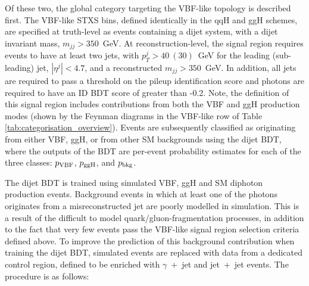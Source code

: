 Of these two, the global category targeting the VBF-like topology is described first. The VBF-like STXS bins, defined identically in the qqH and ggH schemes, are specified at truth-level as events containing a dijet system, with a dijet invariant mass, $m_{jj}>350$~GeV. At reconstruction-level, the signal region requires events to have at least two jets, with $p_T^{j}>40~(30)$~GeV for the leading (sub-leading) jet, $|\eta^j|<4.7$, and a reconstructed $m_{jj}>350$~GeV. In addition, all jets are required to pass a threshold on the pileup identification score and photons are required to have an ID BDT score of greater than -0.2. Note, the definition of this signal region includes contributions from both the VBF and ggH production modes (shown by the Feynman diagrams in the VBF-like row of Table \ref{tab:categorisation_overview}). Events are subsequently classified as originating from either VBF, ggH, or from other SM backgrounds using the dijet BDT, where the outputs of the BDT are per-event probability estimates for each of the three classes: $p_{\rm{VBF}}$, $p_{\rm{ggH}}$, and $p_{\rm{bkg}}$.

The dijet BDT is trained using simulated VBF, ggH and SM diphoton production events. Background events in which at least one of the photons originates from a misreconstructed jet are poorly modelled in simulation. This is a result of the difficult to model quark/gluon-fragmentation processes, in addition to the fact that very few events pass the VBF-like signal region selection criteria defined above. To improve the prediction of this background contribution when training the dijet BDT, simulated events are replaced with data from a dedicated control region, defined to be enriched with $\gamma$~+~jet and jet~+~jet events. The procedure is as follows:

